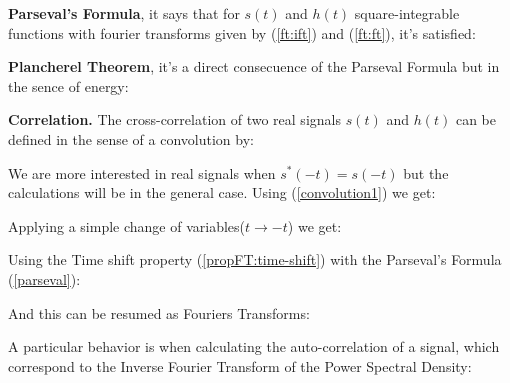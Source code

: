 \begin{description}
	\item \textbf{Parseval's Formula}, it says that for $s(t)$ and $h(t)$ square-integrable functions with fourier transforms given by (\ref{ft:ift}) and (\ref{ft:ft}), it's satisfied:
	
	
	 \item \textbf{Plancherel Theorem}, it's a direct consecuence of the Parseval Formula but in the sence of energy:
	 
	
	\item \textbf{Correlation.} The cross-correlation of two real signals $s(t)$ and $h(t)$ can be defined in the sense of a convolution by:
	
	
	\newp We are more interested in real signals when $s^{*}(-t) = s(-t)$ but the calculations will be in the general case. Using (\ref{convolution1}) we get:
	
	
	\newp Applying a simple change of variables($t \longrightarrow -t$) we get:
	
	
	\newp Using the Time shift property (\ref{propFT:time-shift}) with the Parseval's Formula (\ref{parseval}):
	
	
	\newp And this can be resumed as Fouriers Transforms:
	
	
	\newp A particular behavior is when calculating the auto-correlation of a signal, which correspond to the Inverse Fourier Transform of the Power Spectral Density:
	
	 
\end{description}

